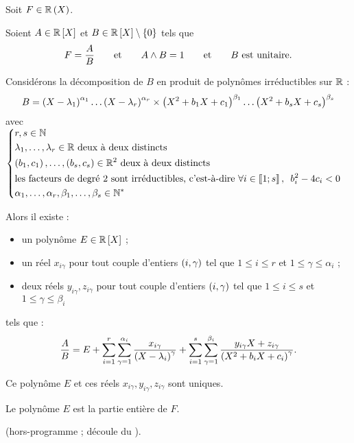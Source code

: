 \begin{theo}
Soit \(F\in\fracrat[\R]\).

Soient \(A\in\poly[\R]\) et \(B\in\poly[\R]\excluant\accol{0}\) tels que \[F=\dfrac{A}{B}\qquad\text{et}\qquad A\land B=1\qquad\text{et}\qquad B\text{ est unitaire}.\]

Considérons la décomposition de \(B\) en produit de polynômes irréductibles sur \(\mathbb{R}\) : \[B=\left(X-\lambda_1\right)^{\alpha_1}\dots\left(X-\lambda_r\right)^{\alpha_r}\times\left(X^2+b_1X+c_1\right)^{\beta_1}\dots\left(X^2+b_sX+c_s\right)^{\beta_s}\] avec \(\begin{dcases}r,s\in\N \\ \lambda_1,\dots,\lambda_r\in\R\text{ deux à deux distincts} \\ \paren{b_1,c_1},\dots,\paren{b_s,c_s}\in\R^2\text{ deux à deux distincts} \\ \text{les facteurs de degré 2 sont irréductibles, \cad}\quantifs{\forall i\in\interventierii{1}{s}}b_i^2-4c_i<0 \\ \alpha_1,\dots,\alpha_r,\beta_1,\dots,\beta_s\in\Ns\end{dcases}\)

Alors il existe :

\begin{itemize}
\item un polynôme \(E\in\poly[\R]\) ; \\

\item un réel \(x_{i\gamma}\) pour tout couple d'entiers \(\left(i,\gamma\right)\) tel que \(1\leq i\leq r\) et \(1\leq\gamma\leq\alpha_i\) ; \\

\item deux réels \(y_{i\gamma},z_{i\gamma}\) pour tout couple d'entiers \(\left(i,\gamma\right)\) tel que \(1\leq i\leq s\) et \(1\leq\gamma\leq\beta_i\)
\end{itemize}

tels que : \[\dfrac{A}{B}=E+\sum_{i=1}^r\sum_{\gamma=1}^{\alpha_i}\dfrac{x_{i\gamma}}{\left(X-\lambda_i\right)^\gamma}+\sum_{i=1}^s\sum_{\gamma=1}^{\beta_i}\dfrac{y_{i\gamma}X+z_{i\gamma}}{\left(X^2+b_iX+c_i\right)^\gamma}.\]

Ce polynôme \(E\) et ces réels \(x_{i\gamma},y_{i\gamma},z_{i\gamma}\) sont uniques.

Le polynôme \(E\) est la partie entière de \(F\).
\end{theo}

\begin{dem}
 (hors-programme ; découle du ).
\end{dem}

